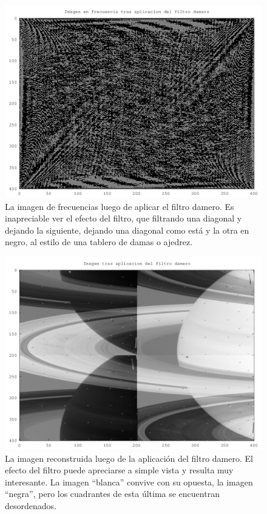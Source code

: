 \documentclass[twocolumn,a4paper,10pt]{article}
\begin{document}
\begin{figure}[H]
        \includegraphics[width=\linewidth]{../images/dameroFilterFreq.png}
        \caption{La imagen de frecuencias luego de aplicar el filtro damero. Es inapreciable ver el efecto del filtro, que filtrando una diagonal y dejando  
        la siguiente, dejando una diagonal como está y la otra en negro, al estilo de una tablero de damas o ajedrez.}
        \label{fig:dameroFilterFrequency}
\end{figure}

\begin{figure}[H]
        \includegraphics[width=\linewidth]{../images/dameroFilter.png}
        \caption{La imagen reconstruida luego de la aplicaci\'on del filtro damero. El efecto del filtro puede apreciarse a simple vista y resulta muy interesante.
        La imagen ``blanca'' convive con su opuesta, la imagen ``negra'', pero los cuadrantes de esta última se encuentran desordenados.}
        \label{fig:dameroFilter}
\end{figure}
\end{document}
